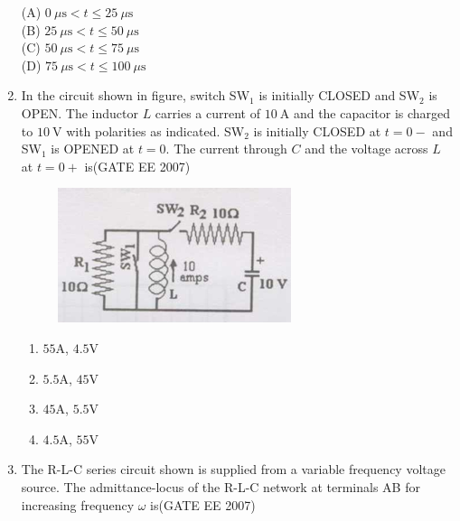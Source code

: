 \documentclass[a4paper,10pt]{exam}
\theoremstyle{remark}
\begin{document}
\begin{enumerate}
\begin{multicols}{2}
(A) $0~\mu\mathrm{s} < t \leq 25~\mu\mathrm{s}$ \\
(B) $25~\mu\mathrm{s} < t \leq 50~\mu\mathrm{s}$ \\
(C) $50~\mu\mathrm{s} < t \leq 75~\mu\mathrm{s}$ \\
(D) $75~\mu\mathrm{s} < t \leq 100~\mu\mathrm{s}$ \\
\end{multicols}

\item  \quad In the circuit shown in figure, switch SW$_1$ is initially CLOSED and SW$_2$ is OPEN. The inductor $L$ carries a current of $10~\mathrm{A}$ and the capacitor is charged to $10~\mathrm{V}$ with polarities as indicated. SW$_2$ is initially CLOSED at $t = 0-$ and SW$_1$ is OPENED at $t = 0$. The current through $C$ and the voltage across $L$ at $t = 0+$ is\hfill{(GATE EE 2007)} 

\begin{figure}[H]
    \centering
    \includegraphics[width=0.5\linewidth]{figs/Q 61.png}
\end{figure}


\begin{multicols}{4}
\begin{enumerate}
\item $55$A, $4.5$V
\item $5.5$A, $45$V
\item  $45$A, $5.5$V
\item $4.5$A, $55$V
\end{enumerate}
\end{multicols}

\vfill
{}
\newpage
\item  \quad The R-L-C series circuit shown is supplied from a variable frequency voltage source. The admittance-locus of the R-L-C network at terminals AB for increasing frequency $\omega$ is\hfill{(GATE EE 2007)} 


\end{enumerate}
\end{document}
